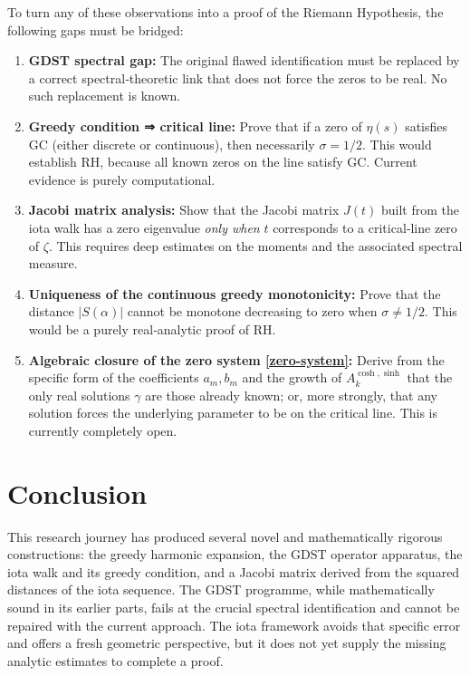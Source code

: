 \documentclass[11pt,a4paper]{article}
\begin{document}
To turn any of these observations into a proof of the Riemann Hypothesis, the following gaps must be bridged:

\begin{enumerate}[nosep]
	\item \textbf{GDST spectral gap:} The original flawed identification must be replaced by a correct spectral‑theoretic link that does not force the zeros to be real.  No such replacement is known.
	\item \textbf{Greedy condition ⇒ critical line:} Prove that if a zero of \(\eta(s)\) satisfies GC (either discrete or continuous), then necessarily \(\sigma=1/2\).  This would establish RH, because all known zeros on the line satisfy GC.  Current evidence is purely computational.
	\item \textbf{Jacobi matrix analysis:} Show that the Jacobi matrix \(J(t)\) built from the iota walk has a zero eigenvalue \emph{only when} \(t\) corresponds to a critical‑line zero of \(\zeta\).  This requires deep estimates on the moments and the associated spectral measure.
	\item \textbf{Uniqueness of the continuous greedy monotonicity:} Prove that the distance \(|S(\alpha)|\) cannot be monotone decreasing to zero when \(\sigma\neq1/2\).  This would be a purely real‑analytic proof of RH.
	\item \textbf{Algebraic closure of the zero system \eqref{zero-system}:} Derive from the specific form of the coefficients \(a_m,b_m\) and the growth of \(A_k^{\cosh,\sinh}\) that the only real solutions \(\gamma\) are those already known; or, more strongly, that any solution forces the underlying parameter to be on the critical line.  This is currently completely open.
\end{enumerate}

\section{Conclusion}
This research journey has produced several novel and mathematically rigorous constructions: the greedy harmonic expansion, the GDST operator apparatus, the iota walk and its greedy condition, and a Jacobi matrix derived from the squared distances of the iota sequence.  The GDST programme, while mathematically sound in its earlier parts, fails at the crucial spectral identification and cannot be repaired with the current approach.  The iota framework avoids that specific error and offers a fresh geometric perspective, but it does not yet supply the missing analytic estimates to complete a proof.
\end{document}
